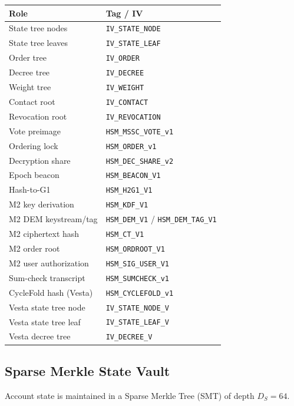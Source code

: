 \documentclass[11pt, a4paper]{article}
\begin{document}
\begin{center}
\begin{tabular}{l|l}
\textbf{Role} & \textbf{Tag / IV} \\
\hline
State tree nodes & \texttt{IV\_STATE\_NODE} \\
State tree leaves & \texttt{IV\_STATE\_LEAF} \\
Order tree & \texttt{IV\_ORDER} \\
Decree tree & \texttt{IV\_DECREE} \\
Weight tree & \texttt{IV\_WEIGHT} \\
Contact root & \texttt{IV\_CONTACT} \\
Revocation root & \texttt{IV\_REVOCATION} \\
Vote preimage & \texttt{HSM\_MSSC\_VOTE\_v1} \\
Ordering lock & \texttt{HSM\_ORDER\_v1} \\
Decryption share & \texttt{HSM\_DEC\_SHARE\_v2} \\
Epoch beacon & \texttt{HSM\_BEACON\_V1} \\
Hash-to-G1 & \texttt{HSM\_H2G1\_V1} \\
M2 key derivation & \texttt{HSM\_KDF\_V1} \\
M2 DEM keystream/tag & \texttt{HSM\_DEM\_V1} / \texttt{HSM\_DEM\_TAG\_V1} \\
M2 ciphertext hash & \texttt{HSM\_CT\_V1} \\
M2 order root & \texttt{HSM\_ORDROOT\_V1} \\
M2 user authorization & \texttt{HSM\_SIG\_USER\_V1} \\
Sum-check transcript & \texttt{HSM\_SUMCHECK\_v1} \\
CycleFold hash (Vesta) & \texttt{HSM\_CYCLEFOLD\_v1} \\
Vesta state tree node & \texttt{IV\_STATE\_NODE\_V} \\
Vesta state tree leaf & \texttt{IV\_STATE\_LEAF\_V} \\
Vesta decree tree & \texttt{IV\_DECREE\_V} \\
\end{tabular}
\end{center}

\subsection{Sparse Merkle State Vault}

Account state is maintained in a Sparse Merkle Tree (SMT) of depth $D_S = 64$.
\end{document}
